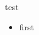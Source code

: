 \documentclass{beamer}
\begin{document}
\begin{frame}{test}

\begingroup
\beamerdefaultoverlayspecification{} 
\begin{itemize}
\item first
\end{itemize}
\endgroup

\end{frame}
\end{document}
